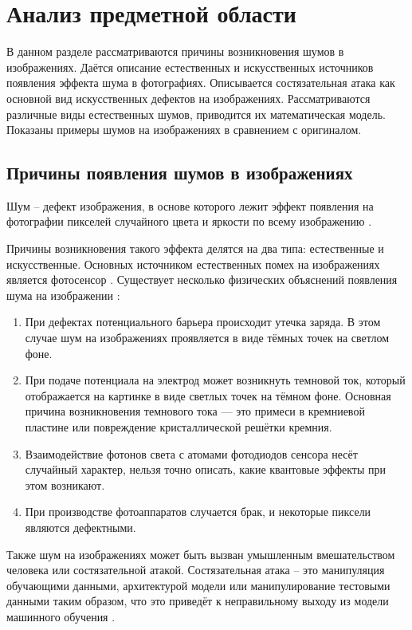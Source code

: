 \section{Анализ предметной области}
В данном разделе рассматриваются причины возникновения шумов в изображениях. 
Даётся описание естественных и искусственных источников появления эффекта шума в фотографиях.
Описывается состязательная атака как основной вид искусственных дефектов на изображениях.
Рассматриваются различные виды естественных шумов, приводится их математическая модель.
Показаны примеры шумов на изображениях в сравнением с оригиналом.


\subsection{Причины появления шумов в изображениях}
Шум -- дефект изображения, в основе которого лежит эффект появления на фотографии пикселей случайного цвета и яркости по всему изображению \cite{shum}. 

Причины возникновения такого эффекта делятся на два типа: естественные и искусственные.
Основных источником естественных помех на изображениях является фотосенсор \cite{shum}.
Существует несколько физических объяснений появления шума на изображении \cite{causes}:
\begin{enumerate}
	\item При дефектах потенциального барьера происходит утечка заряда. В этом случае шум на изображениях проявляется в виде тёмных точек на светлом фоне.
	\item При подаче потенциала на электрод может возникнуть темновой ток, который отображается на картинке в виде светлых точек на тёмном фоне. Основная причина возникновения темнового тока — это примеси в кремниевой пластине или повреждение кристаллической решётки кремния. 
	\item Взаимодействие фотонов света с атомами фотодиодов сенсора несёт случайный характер, нельзя точно описать, какие квантовые эффекты при этом возникают.
	\item При производстве фотоаппаратов случается брак, и некоторые пиксели являются дефектными. 
\end{enumerate}

Также шум на изображениях может быть вызван умышленным вмешательством человека или состязательной атакой. 
Состязательная атака – это манипуляция обучающими данными, архитектурой модели или манипулирование тестовыми данными таким
образом, что это приведёт к неправильному выходу из модели машинного обучения \cite{impact}.

